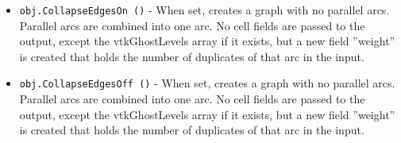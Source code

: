 \begin{itemize}
\item  \verb|obj.CollapseEdgesOn ()| -  When set, creates a graph with no parallel arcs.
 Parallel arcs are combined into one arc.
 No cell fields are passed to the output, except the vtkGhostLevels array if
 it exists, but a new field ''weight'' is created that holds the number of 
 duplicates of that arc in the input.

\item  \verb|obj.CollapseEdgesOff ()| -  When set, creates a graph with no parallel arcs.
 Parallel arcs are combined into one arc.
 No cell fields are passed to the output, except the vtkGhostLevels array if
 it exists, but a new field ''weight'' is created that holds the number of 
 duplicates of that arc in the input.

\end{itemize}
